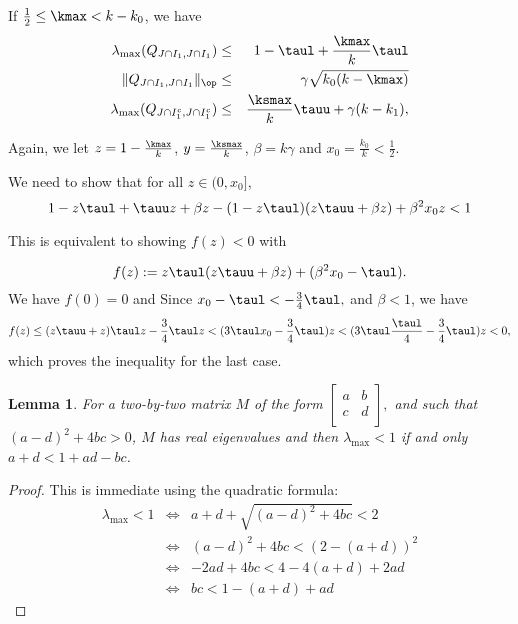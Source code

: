 \documentclass{article}
\newtheorem{lemma}{Lemma}
\begin{document}
\item  If $\frac{1}{2} \leq \kmax < k-k_0$, we have
\begin{eqnarray*}
\lambda_{\max}(Q_{J \cap I_1,J \cap I_1}) & \leq & 1-\taul +\frac{\kmax}{k} \taul\\
\|Q_{J \cap I_1,J \cap I_1}\|_{\op} & \leq & \gamma \sqrt{k_0 (k-\kmax)}\\
\lambda_{\max}(Q_{J \cap I_1^c,J \cap I_1^c})  & \leq & \frac{\ksmax}{k}\tauu+\gamma (k-k_1), 
\end{eqnarray*}

Again, we let $z=1-\frac{\kmax}{k}$, $y=\frac{\ksmax}{k}$, $\beta=k{\gamma}$ and $x_0=\frac{k_0}{k}<\frac{1}{2}$.

We need to show that for all $z \in (0,x_0]$,
$$1-z \taul+\tauu z+\beta z-(1-z \taul) (z\tauu+\beta z)+\beta^2 x_0 z<1$$

This is equivalent to showing $f(z)<0$ with

$$f(z):=z \taul(z\tauu+\beta z)+(\beta^2 x_0 -\taul).$$ 
We have $f(0)=0$ and 
Since $x_0-\taul<-\frac{3}{4}\taul,$ and $\beta<1$,
we have 
$$
f(z) \leq  (z\tauu+ z) \taul z-\frac{3}{4}\taul z
<  (3\taul x_0-\frac{3}{4}\taul) z
<  (3\taul \frac{\taul}{4}-\frac{3}{4}\taul) z<0,
$$
which proves the inequality for the last case.
\EIT


\begin{lemma}
\label{lem:cns_lmaxleqone}
For a two-by-two matrix $M$ of the form
$\begin{bmatrix}
a & b\\
c & d \\
\end{bmatrix},
$
and such that $(a-d)^2+4bc>0$, $M$ has real eigenvalues and 
then $\lambda_{\max}<1$ if and only $a+d < 1+ad-bc$.
\end{lemma}
\begin{proof}
This is immediate using the quadratic formula:
\begin{eqnarray*}
\lambda_{\max}<1 &\Leftrightarrow& a+d+\sqrt{(a-d)^2+4bc}<2\\
&\Leftrightarrow& (a-d)^2+4bc<(2-(a+d))^2\\
&\Leftrightarrow& -2ad+4bc<4-4(a+d)+2ad\\
&\Leftrightarrow&  bc<1-(a+d)+ad
\end{eqnarray*}
\end{proof}
\end{document}
